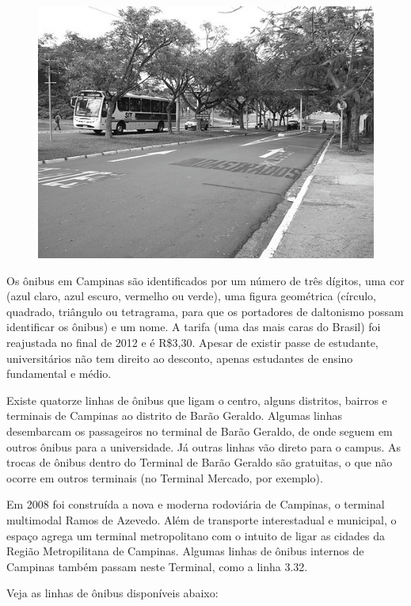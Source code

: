 \begin{figure}[h!]
    \centering
    \includegraphics[scale=0.58,keepaspectratio=true]{img/imgs/8-transporte/-085.jpg}
\end{figure}

Os ônibus em Campinas são identificados por um número de três dígitos, uma cor
(azul claro, azul escuro, vermelho ou verde), uma figura geométrica (círculo,
quadrado, triângulo ou tetragrama, para que os portadores de daltonismo possam
identificar os ônibus) e um nome. A tarifa (uma das mais caras do Brasil) foi
reajustada no final de 2012 e é R\$3,30. Apesar de existir passe de estudante,
universitários não tem direito ao desconto, apenas estudantes de ensino
fundamental e médio.

Existe quatorze linhas de ônibus que ligam o centro, alguns distritos, bairros e
terminais de Campinas ao distrito de Barão Geraldo. Algumas linhas desembarcam
os passageiros no terminal de Barão Geraldo, de onde seguem em outros ônibus
para a universidade. Já outras linhas vão direto para o campus. As trocas de
ônibus dentro do Terminal de Barão Geraldo são gratuitas, o que não ocorre em
outros terminais (no Terminal Mercado, por exemplo).

Em 2008 foi construída a nova e moderna rodoviária de Campinas, o terminal
multimodal Ramos de Azevedo. Além de transporte interestadual e municipal, o
espaço agrega um terminal metropolitano com o intuito de ligar as cidades da
Região Metropilitana de Campinas. Algumas linhas de ônibus internos de Campinas
também passam neste Terminal, como a linha 3.32.

Veja as linhas de ônibus disponíveis abaixo:

